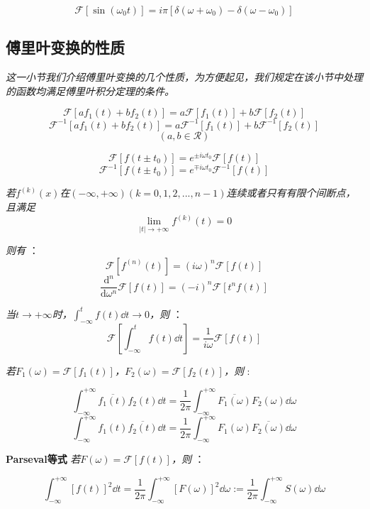 \[\mathcal{F}[\sin(\omega_0t)]=i\pi[\delta(\omega+\omega_0)-\delta(\omega-\omega_0)] \tag{o2}\]

\subsection{傅里叶变换的性质}

\textit{这一小节我们介绍傅里叶变换的几个性质，为方便起见，我们规定在该小节中处理的函数均满足傅里叶积分定理的条件。}


\[\mathcal{F}[af_1(t)+bf_2(t)]=a\mathcal{F}[f_1(t)]+b\mathcal{F}[f_2(t)]\]
\[\mathcal{F}^{-1}[af_1(t)+bf_2(t)]=a\mathcal{F}^{-1}[f_1(t)]+b\mathcal{F}^{-1}[f_2(t)]\]
\[(a,b \in \mathcal{R})\]

\[\mathcal{F}[f(t \pm t_0)]=e^{\pm i\omega t_0}\mathcal{F}[f(t)]\]
\[\mathcal{F}^{-1}[f(t \pm t_0)]=e^{\mp i\omega t_0}\mathcal{F}^{-1}[f(t)]\]


\textit{若$f^{(k)}(x)$在$(-\infty,+\infty)$$(k=0,1,2,...,n-1)$连续或者只有有限个间断点，且满足 }
\[\lim_{|t|\rightarrow +\infty}f^{(k)}(t)=0\]

\textit{则有 }：
\[\mathcal{F}[f^{(n)}(t)]=(i\omega)^n \mathcal{F}[f(t)]\]
\[\frac{\mathrm {d}^n}{\mathrm {d} \omega^n} \mathcal{F}[f(t)]=(-i)^n \mathcal{F}[t^nf(t)]\]


\textit{当$t \rightarrow +\infty$时，$\int_{-\infty}^{t}f(t)\dd{t} \rightarrow 0$，则 }：
\[ \mathcal{F}[\int_{-\infty}^{t}f(t)\dd{t}]=\frac{1}{i\omega}\mathcal{F}[f(t)]\]


\textit{若$F_1(\omega)=\mathcal{F}[f_1(t)]$，$F_2(\omega)=\mathcal{F}[f_2(t)]$，则 }:

\[\int_{-\infty}^{+\infty}\overline{f_1(t)}f_2(t)\dd{t}=\frac{1}{2\pi}\int_{-\infty}^{+\infty}\overline{F_1(\omega)}F_2(\omega)\dd{\omega}\]
\[\int_{-\infty}^{+\infty}f_1(t)\overline{f_2(t)}\dd{t}=\frac{1}{2\pi}\int_{-\infty}^{+\infty}F_1(\omega)\overline{F_2(\omega)}\dd{\omega}\]


\textbf{Parseval等式} \qquad \textit{若$F(\omega)=\mathcal{F}[f(t)]$，则 }：

\[\int_{-\infty}^{+\infty}[f(t)]^2\dd{t}=\frac{1}{2\pi}\int_{-\infty}^{+\infty}[F(\omega)]^2\dd{\omega}:=\frac{1}{2\pi}\int_{-\infty}^{+\infty}S(\omega)\dd{\omega}\]

